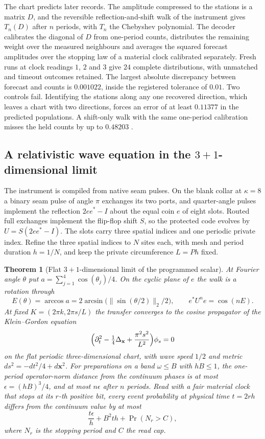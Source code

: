 \documentclass[11pt]{article}
\newtheorem{theorem}{Theorem}[section]
\theoremstyle{definition}
\theoremstyle{remark}
\begin{document}
The chart predicts later records. The amplitude compressed to the
stations is a matrix $D$, and the reversible reflection-and-shift walk
of the instrument gives $T_n(D)$ after $n$ periods, with $T_n$ the
Chebyshev polynomial. The decoder calibrates the diagonal of $D$ from
one-period counts, distributes the remaining weight over the measured
neighbours and averages the squared forecast amplitudes over the
stopping law of a material clock calibrated separately. Fresh runs at
clock readings $1$, $2$ and $3$ give $24$ complete distributions, with
unmatched and timeout outcomes retained. The largest absolute
discrepancy between forecast and counts is $0.001022$, inside the
registered tolerance of $0.01$. Two controls fail. Identifying the
stations along any one recovered direction, which leaves a chart with
two directions, forces an error of at least $0.11377$ in the predicted
populations. A shift-only walk with the same one-period calibration
misses the held counts by up to $0.48203$ \cite{ophmodel}.

\subsection{A relativistic wave equation in the \texorpdfstring{$3{+}1$}{3+1}-dimensional limit}
\label{sec:scalar-limit}

The instrument is compiled from native seam pulses. On the blank collar
at $\kappa=8$ a binary seam pulse of angle $\pi$ exchanges its two
ports, and quarter-angle pulses implement the reflection $2ee^{*}-I$
about the equal coin $e$ of eight slots. Routed full exchanges implement
the flip-flop shift $S$, so the protected code evolves by
$U=S(2ee^{*}-I)$. The slots carry three spatial indices and one periodic
private index. Refine the three spatial indices to $N$ sites each, with
mesh and period duration $h=1/N$, and keep the private circumference
$L=Ph$ fixed.

\begin{theorem}[Flat $3{+}1$-dimensional limit of the programmed scalar]
\label{thm:scalar-limit}
At Fourier angle $\theta$ put $a=\sum_{j=1}^4\cos(\theta_j)/4$. On the
cyclic plane of $e$ the walk is a rotation through
\[
 E(\theta)=\arccos a=2\arcsin\bigl(\|\sin(\theta/2)\|_2/2\bigr),
 \qquad e^{*}U^ne=\cos(nE).
\]
At fixed $K=(2\pi k,2\pi s/L)$ the transfer converges to the cosine
propagator of the Klein--Gordon equation
\[
 \Bigl(\partial_t^2-\tfrac14\Delta_{\mathbf x}+\frac{\pi^2s^2}{L^2}\Bigr)\phi_s=0
\]
on the flat periodic three-dimensional chart, with wave speed $1/2$ and
metric $ds^2=-dt^2/4+d\mathbf x^2$. For preparations on a band
$\omega\le B$ with $hB\le1$, the one-period operator-norm distance from
the continuum phases is at most $\epsilon=(hB)^3/4$, and at most
$n\epsilon$ after $n$ periods. Read with a fair material clock that
stops at its $r$-th positive bit, every event probability at physical
time $t=2rh$ differs from the continuum value by at most
\[
 \frac{t\epsilon}{h}+B^2th+\Pr(N_r>C),
\]
where $N_r$ is the stopping period and $C$ the read cap.
\end{theorem}
\end{document}
